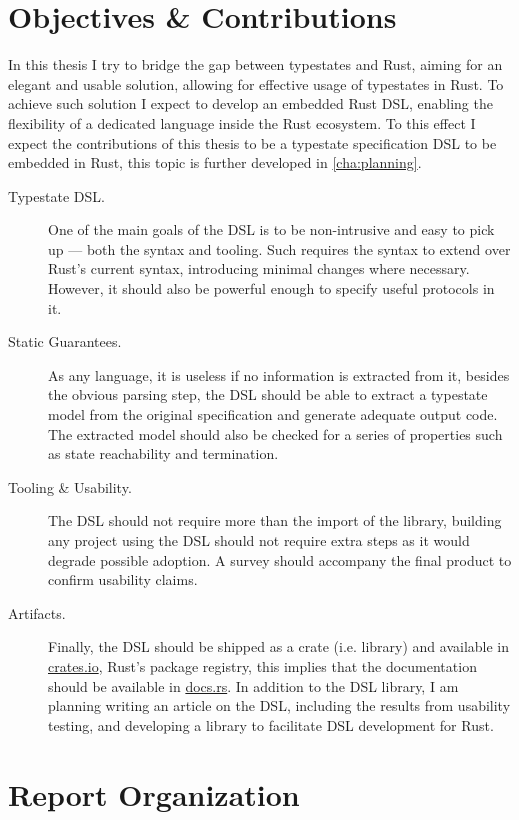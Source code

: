 \section{Objectives \& Contributions}\label{sec:objectives}

In this thesis I try to bridge the gap between typestates and Rust,
aiming for an elegant and usable solution, allowing for effective usage of typestates in Rust.
To achieve such solution I expect to develop an embedded Rust DSL,
enabling the flexibility of a dedicated language inside the Rust ecosystem.
To this effect I expect the contributions of this thesis to be a typestate specification DSL to be embedded in Rust,
this topic is further developed in \autoref{cha:planning}.

\begin{description}
    \item[Typestate DSL.] One of the main goals of the DSL is to be non-intrusive and easy to pick up --- both the syntax and tooling.
          Such requires the syntax to extend over Rust's current syntax, introducing minimal changes where necessary.
          However, it should also be powerful enough to specify useful protocols in it.
    \item[Static Guarantees.] As any language, it is useless if no information is extracted from it,
          besides the obvious parsing step,
          the DSL should be able to extract a typestate model from the original specification and generate adequate output code.
          The extracted model should also be checked for a series of properties such as state reachability and termination.
    \item[Tooling \& Usability.] The DSL should not require more than the import of the library,
          building any project using the DSL should not require extra steps as it would degrade possible adoption.
          A survey should accompany the final product to confirm usability claims.
    \item[Artifacts.] Finally, the DSL should be shipped as a crate (i.e. library) and available in \url{crates.io}, Rust's package registry,
          this implies that the documentation should be available in \url{docs.rs}.
          In addition to the DSL library, I am planning writing an article on the DSL, including the results from usability testing,
          and developing a library to facilitate DSL development for Rust.
\end{description}

\section{Report Organization}\label{sec:organization}

